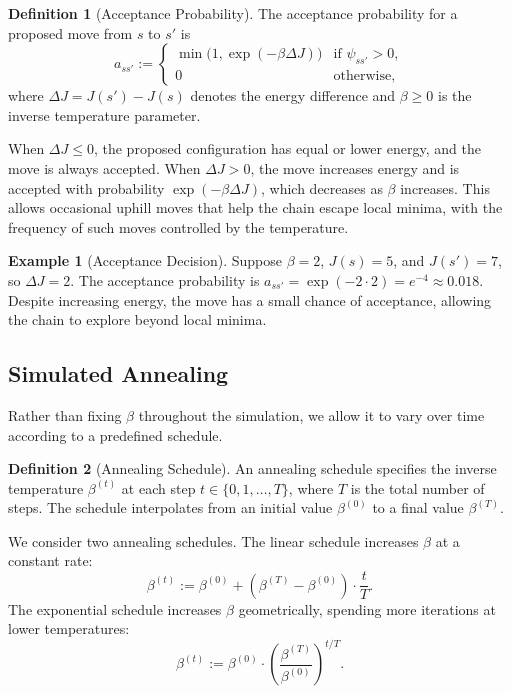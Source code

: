 \documentclass[10pt,twocolumn,a4paper]{article}
\theoremstyle{definition}
\newtheorem{definition}{Definition}[section]
\newtheorem{example}{Example}[section]
\theoremstyle{remark}
\begin{document}
\begin{definition}[Acceptance Probability]
The acceptance probability for a proposed move from $s$ to $s'$ is
\begin{equation}
a_{ss'}:=\begin{cases}
\min\bigl(1,\exp(-\beta\Delta J)\bigr)&\text{if }\psi_{ss'}>0,\\
0&\text{otherwise},
\end{cases}
\end{equation}
where $\Delta J=J(s')-J(s)$ denotes the energy difference and $\beta\ge0$ is the inverse temperature parameter.
\end{definition}
When $\Delta J\le0$, the proposed configuration has equal or lower energy, and the move is always accepted. When $\Delta J>0$, the move increases energy and is accepted with probability $\exp(-\beta\Delta J)$, which decreases as $\beta$ increases. This allows occasional uphill moves that help the chain escape local minima, with the frequency of such moves controlled by the temperature.

\begin{example}[Acceptance Decision]
Suppose $\beta=2$, $J(s)=5$, and $J(s')=7$, so $\Delta J=2$. The acceptance probability is $a_{ss'}=\exp(-2\cdot2)=e^{-4}\approx0.018$. Despite increasing energy, the move has a small chance of acceptance, allowing the chain to explore beyond local minima.
\end{example}

\subsection{Simulated Annealing}
Rather than fixing $\beta$ throughout the simulation, we allow it to vary over time according to a predefined schedule.

\begin{definition}[Annealing Schedule]
An annealing schedule specifies the inverse temperature $\beta^{(t)}$ at each step $t\in\{0,1,\ldots,T\}$, where $T$ is the total number of steps. The schedule interpolates from an initial value $\beta^{(0)}$ to a final value $\beta^{(T)}$.
\end{definition}
We consider two annealing schedules. The linear schedule increases $\beta$ at a constant rate:
\begin{equation}
\beta^{(t)}:=\beta^{(0)}+\left(\beta^{(T)}-\beta^{(0)}\right)\cdot\frac{t}{T}.
\end{equation}
The exponential schedule increases $\beta$ geometrically, spending more iterations at lower temperatures:
\begin{equation}
\beta^{(t)}:=\beta^{(0)}\cdot\left(\frac{\beta^{(T)}}{\beta^{(0)}}\right)^{t/T}.
\end{equation}
\end{document}
